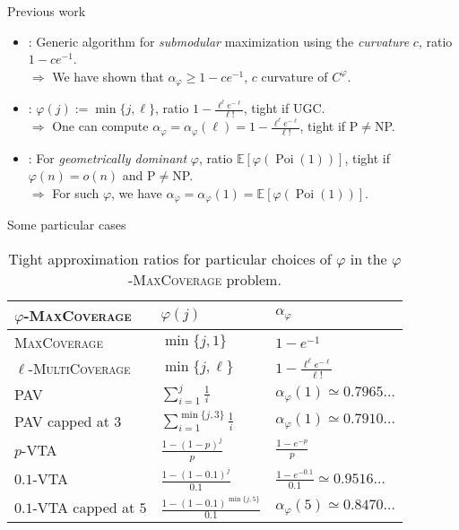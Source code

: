 \documentclass{beamer}
\theoremstyle{definition}
\theoremstyle{remark}
\DeclareMathOperator{\Poi}{\text{Poi}}
\begin{document}
\begin{frame}{Previous work}
  \begin{itemize}
  \item \cite{SVW17}: Generic algorithm for \emph{submodular} maximization using the \emph{curvature} $c$, ratio $1-ce^{-1}$.\\
  $\Rightarrow$ We have shown that $\alpha_{\varphi} \geq 1-ce^{-1}$, $c$ curvature of $C^{\varphi}$.
    \pause
    \bigskip
  \item \cite{BFGG20}: $\varphi(j):=\min\{ j,\ell\}$, ratio $1-\frac{\ell^{\ell}e^{-\ell}}{\ell!}$, tight if UGC.\\
  $\Rightarrow$ One can compute $\alpha_{\varphi} = \alpha_{\varphi}(\ell) = 1-\frac{\ell^{\ell}e^{-\ell}}{\ell!}$, tight if \textrm{P}$\not=$\textrm{NP}.
    \pause
    \bigskip
  \item \cite{DMMS20}: For \emph{geometrically dominant} $\varphi$, ratio $\mathbb{E}[\varphi(\Poi(1))]$, tight if $\varphi(n) = o(n)$ and \textrm{P}$\not=$\textrm{NP}.\\
  $\Rightarrow$ For such $\varphi$, we have $\alpha_\varphi=\alpha_\varphi(1)=\mathbb{E}[\varphi(\Poi(1))]$.
  \end{itemize}
\end{frame}

\begin{frame}{Some particular cases}
  \begin{table}[!h]
  \begin{center}
    \begin{tabular}{|l|l|l|}
      \hline
      $\varphi$-\textsc{MaxCoverage}  & $\varphi(j)$ & $\alpha_{\varphi}$ \\
      \hline
      \textsc{MaxCoverage} & $\min \{ j,1\}$ & $1 - e^{-1}$  \\
      $\ell$-\textsc{MultiCoverage} & $\min\{ j,\ell\}$ & $1-\frac{\ell^{\ell}e^{-\ell}}{\ell!}$ \\
       \textsc{PAV} & $\sum_{i=1}^j \frac{1}{i}$ & $\alpha_{\varphi}(1) \simeq 0.7965\ldots$\\
      \textsc{PAV} capped at $3$ & $\sum_{i=1}^{\min\{j,3\}} \frac{1}{i}$ & $\alpha_{\varphi}(1) \simeq 0.7910\ldots$ \\
      $p$-\textsc{VTA} & $\frac{1-(1-p)^j}{p}$ & $\frac{1 - e^{-p}}{p}$  \\
      $0.1$-\textsc{VTA} & $\frac{1-(1-0.1)^j}{0.1}$ & $\frac{1 - e^{-0.1}}{0.1} \simeq 0.9516\ldots$ \\
      $0.1$-\textsc{VTA} capped at $5$ & $\frac{1-(1-0.1)^{\min\{j,5\}}}{0.1}$ & $\alpha_{\varphi}(5) \simeq 0.8470\ldots$  \\
      \hline
    \end{tabular}
  \end{center}
  \caption{Tight approximation ratios for particular choices of $\varphi$ in the $\varphi$-\textsc{MaxCoverage} problem.}
  \label{figComp}
\end{table}
\end{frame}
\end{document}
